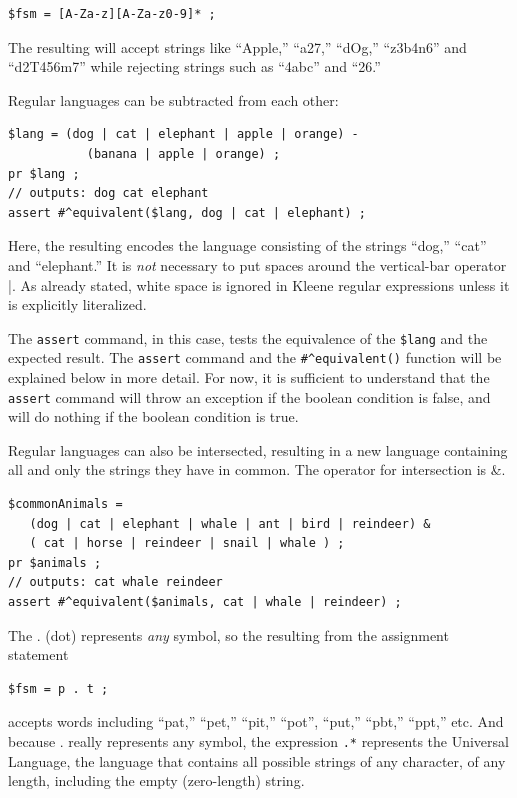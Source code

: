 \begin{Verbatim}
$fsm = [A-Za-z][A-Za-z0-9]* ;
\end{Verbatim}

\noindent
The resulting \fsm{} will accept strings like ``Apple,'' ``a27,'' ``dOg,''
``z3b4n6'' and
``d2T456m7'' while rejecting strings such as ``4abc'' and ``26.''

Regular languages can be subtracted from each other:

\begin{Verbatim}
$lang = (dog | cat | elephant | apple | orange) - 
           (banana | apple | orange) ;
pr $lang ;
// outputs: dog cat elephant
assert #^equivalent($lang, dog | cat | elephant) ;
\end{Verbatim}

\noindent
Here, the resulting \fsm{} encodes the language consisting of 
the strings ``dog,'' ``cat'' and ``elephant.''
It is \emph{not} necessary to put spaces around the vertical-bar operator |.
As already stated, white space is ignored in Kleene regular expressions
unless it is explicitly literalized.

The \texttt{assert} command, in this case, tests the equivalence
of the \fsm{} \verb!$lang! and the expected result.  The \texttt{assert}
command and the \verb!#^equivalent()! function will be explained below in more detail.
For now, it is sufficient to understand that the \texttt{assert} command will
throw an exception if the boolean condition is false, and will do nothing if the
boolean condition is true.

Regular languages can also be intersected, resulting in a new language
containing all and only the strings they have in common.
The operator for intersection is \&.

\begin{Verbatim}
$commonAnimals = 
   (dog | cat | elephant | whale | ant | bird | reindeer) & 
   ( cat | horse | reindeer | snail | whale ) ; 
pr $animals ;
// outputs: cat whale reindeer
assert #^equivalent($animals, cat | whale | reindeer) ;
\end{Verbatim}

The . (dot) represents \emph{any} symbol, so the \fsm{} resulting from the
assignment statement

\begin{Verbatim}
$fsm = p . t ;
\end{Verbatim}

\noindent
accepts words including ``pat,'' ``pet,'' ``pit,'' ``pot'',
``put,'' ``pbt,'' ``ppt,'' etc.  And because . really 
represents any symbol, the expression
\verb!.*! represents the Universal Language, the language that contains all possible
strings of any character, of any length, including the empty (zero-length) string.

